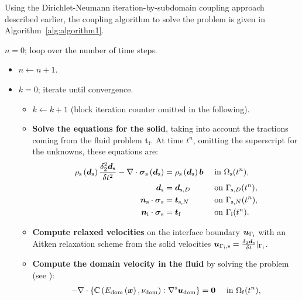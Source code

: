 \documentclass[11pt,english]{article}
\def\sigmasolid{\boldsymbol{\sigma}_{\rm{s}}}
\def\boundaryinterface{\Gamma_{\rm{i}}}
\begin{document}
Using the Dirichlet-Neumann iteration-by-subdomain coupling approach described earlier, the coupling algorithm to solve the problem is given in Algorithm~\ref{alg:algorithm1}.

\begin{algorithm}
\small
\caption{FSI algorithm}\label{alg:algorithm1}
$n = 0$; loop over the number of time steps.
\begin{itemize}
\item[] $n \gets n + 1$.
\item [] $k=0$; iterate until convergence.
\begin{itemize}
    \item[] $k \gets k + 1$ (block iteration counter omitted in the following).
 \item[$\bullet$] {\bf Solve the equations for the solid}, taking into account the tractions coming from the fluid problem $\boldsymbol{t}_{\mathrm{f}}$. At time $t^n$, omitting the superscript for the unknowns, these equations are:
 \begin{align*}
    \rho_\mathrm{s}\left(\boldsymbol{d}_{\mathrm{s}}\right)\frac{\delta_2^{2}\boldsymbol{d}_{\mathrm{s}}}{\delta t^2} -\nabla \cdot \boldsymbol{\sigma}_{\mathrm{s}}\left(\boldsymbol{d}_{\mathrm{s}}\right) &= \rho_{\mathrm{s}}\left(\boldsymbol{d}_{\mathrm{s}}\right) \boldsymbol{b} && \text{ in } \ensuremath{\Omega}_{\rm{s}}(t^n), \\
    \boldsymbol{d}_{\mathrm{s}} &= \boldsymbol{d}_{\mathrm{s},D}  &&\text{ on } \Gamma_{\mathrm{s},D}(t^n), \\
    \boldsymbol{n}_\mathrm{s}\cdot\boldsymbol{\sigma}_\mathrm{s} &= \boldsymbol{t}_{\mathrm{s},N}  &&\text{ on } \Gamma_{\mathrm{s},N}(t^n),\\
    \boldsymbol{n}_{\mathrm{i}} \cdot \sigmasolid &= \boldsymbol{t}_{\mathrm{f}} &&\text{ on } \boundaryinterface(t^n).
 \end{align*}
     \item[$\bullet$] {\bf Compute relaxed velocities} on the interface boundary $\boldsymbol{u}_{\boundaryinterface}$ with an Aitken relaxation scheme from the solid velocities
     $\boldsymbol{u}_{{\Gamma_{\rm i},{\textrm{s}}}} = \frac{\delta_2 \boldsymbol{d}_{\mathrm{s}}}{\delta t}\vert_{\Gamma_{\rm i}}$.
     \item[$\bullet$] {\bf Compute the domain velocity in the fluid} by solving the problem (see \cite{Mesh}):
    \begin{align*}
    -\nabla \cdot \left \lbrace \mathbb{C} \left(E_{\mathrm{dom}}\left( \boldsymbol{x}\right),\nu_{\mathrm{dom}} \right) : \nabla^{\rm s}\boldsymbol{u}_{\mathrm{dom}} \right \rbrace &={\bf 0} && \text{ in } \ensuremath{\Omega}_{\rm{f}}(t^n),\\

\end{align*}
\end{itemize}
\end{itemize}
\end{algorithm}
\end{document}

